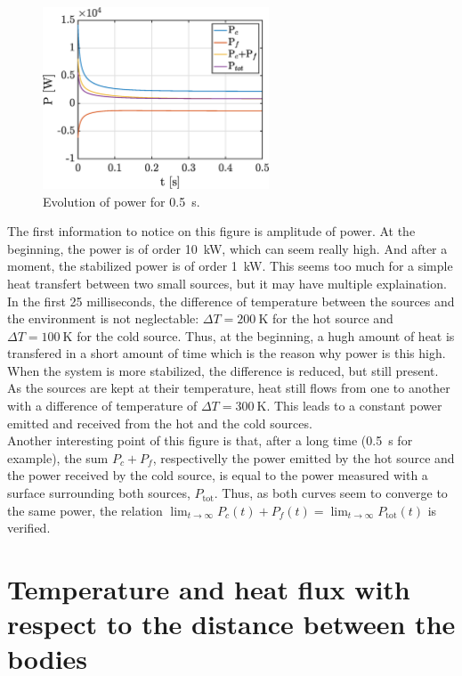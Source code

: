 \documentclass[a4paper,12pt,twoside]{article}
\begin{document}
\begin{figure}[h]
  \centering
  \includegraphics[width=0.6\textwidth]{graphs/d_power.eps}
  \caption{Evolution of power for \SI{0.5}{\s}.}
  \label{fig:d-power}
\end{figure}

The first information to notice on this figure is amplitude of power.
At the beginning, the power is of order \SI{10}{\kilo\watt}, which can seem really high.
And after a moment, the stabilized power is of order \SI{1}{\kilo\watt}.
This seems too much for a simple heat transfert between two small sources, but it may have multiple explaination.
In the first \num{25} milliseconds, the difference of temperature between the sources and the environment is not neglectable: $\Delta T=\SI{200}{\kelvin}$ for the hot source and $\Delta T=\SI{100}{\kelvin}$ for the cold source.
Thus, at the beginning, a hugh amount of heat is transfered in a short amount of time which is the reason why power is this high.
When the system is more stabilized, the difference is reduced, but still present.
As the sources are kept at their temperature, heat still flows from one to another with a difference of temperature of $\Delta T=\SI{300}{\kelvin}$.
This leads to a constant power emitted and received from the hot and the cold sources.\\

Another interesting point of this figure is that, after a long time (\SI{0.5}{\second} for example), the sum $P_c + P_f$, respectivelly the power emitted by the hot source and the power received by the cold source, is equal to the power measured with a surface surrounding both sources, $P_\text{tot}$.
Thus, as both curves seem to converge to the same power, the relation $\lim_{t\rightarrow\infty}P_c(t) + P_f(t) = \lim_{t\rightarrow\infty}P_\text{tot}(t)$ is verified.

\section{Temperature and heat flux with respect to the distance between the bodies}
\end{document}

